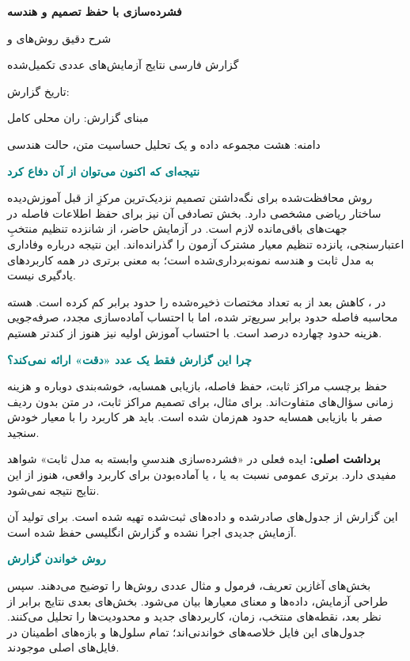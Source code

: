 \documentclass[11pt,a4paper]{article}
\newcommand{\key}[1]{\par\vspace{4pt}\noindent\colorbox{pale}{\parbox{\dimexpr\textwidth-2\fboxsep\relax}{\textbf{برداشت اصلی:} #1}}\par\vspace{3pt}}
\newcommand{\sub}[1]{\par\vspace{3pt}\textbf{\textcolor{teal}{#1}}\par}
\begin{document}
\thispagestyle{empty}
\vspace*{12mm}
{\Huge\bfseries\color{ink} فشرده‌سازی با حفظ تصمیم و هندسه\par}
\vspace{5mm}
{\Large\color{teal} شرح دقیق روش‌های  و \par}
\vspace{4mm}
{\large گزارش فارسی نتایج آزمایش‌های عددی تکمیل‌شده\par}
\vspace{7mm}
تاریخ گزارش: \par
مبنای گزارش: ران محلی کامل \par
دامنه: هشت مجموعه داده و یک تحلیل حساسیت متن،  حالت هندسی\par
\vspace{6mm}
\sub{نتیجه‌ای که اکنون می‌توان از آن دفاع کرد}
روش محافظت‌شده برای نگه‌داشتن تصمیم نزدیک‌ترین مرکزِ از قبل آموزش‌دیده ساختار ریاضی مشخصی دارد. بخش تصادفی آن نیز برای حفظ اطلاعات فاصله در جهت‌های باقی‌مانده لازم است. در آزمایش حاضر، از شانزده تنظیم منتخبِ اعتبارسنجی، پانزده تنظیم معیار مشترک آزمون را گذرانده‌اند. این نتیجه درباره وفاداری به مدل ثابت و هندسه نمونه‌برداری‌شده است؛ به معنی برتری در همه کاربردهای یادگیری نیست.

در ، کاهش بعد از  به  تعداد مختصات ذخیره‌شده را حدود  برابر کم کرده است. هسته محاسبه فاصله حدود  برابر سریع‌تر شده، اما با احتساب آماده‌سازی مجدد، صرفه‌جویی هزینه حدود چهارده درصد است. با احتساب آموزش اولیه نیز هنوز از  کندتر هستیم.

\sub{چرا این گزارش فقط یک عدد «دقت» ارائه نمی‌کند؟}
حفظ برچسب مراکز ثابت، حفظ فاصله، بازیابی همسایه، خوشه‌بندی دوباره و هزینه زمانی سؤال‌های متفاوت‌اند. برای مثال،  برای تصمیم مراکز ثابت، در متن بدون ردیف صفر با بازیابی همسایه حدود  هم‌زمان شده است. باید هر کاربرد را با معیار خودش سنجید.
\key{ایده فعلی در «فشرده‌سازی هندسیِ وابسته به مدل ثابت» شواهد مفیدی دارد. برتری عمومی نسبت به \lr{PCA} یا \lr{Full}، یا آماده‌بودن برای کاربرد واقعی، هنوز از این نتایج نتیجه نمی‌شود.}
\vfill
{\small این گزارش از جدول‌های صادرشده و داده‌های ثبت‌شده تهیه شده است. برای تولید آن آزمایش جدیدی اجرا نشده و گزارش انگلیسی حفظ شده است.}

\clearpage
{\small\linespread{1.0}\selectfont\setlength{\parskip}{0pt}\tableofcontents}
\vfill
\sub{روش خواندن گزارش}
بخش‌های آغازین تعریف، فرمول و مثال عددی روش‌ها را توضیح می‌دهند. سپس طراحی آزمایش، داده‌ها و معنای معیارها بیان می‌شود. بخش‌های بعدی نتایج برابر از نظر بعد، نقطه‌های منتخب، زمان، کاربردهای جدید و محدودیت‌ها را تحلیل می‌کنند. جدول‌های این فایل خلاصه‌های خواندنی‌اند؛ تمام سلول‌ها و بازه‌های اطمینان در فایل‌های  اصلی موجودند.
\end{document}
